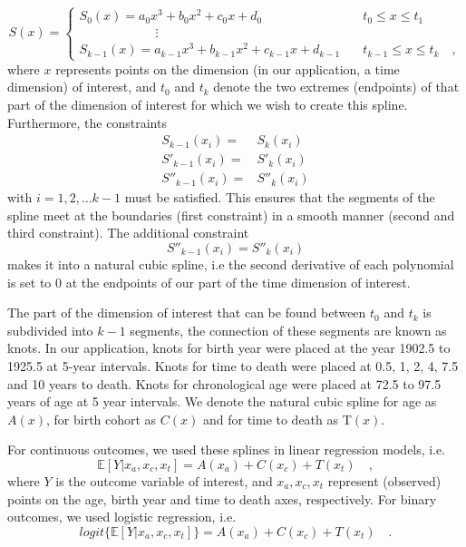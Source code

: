 \documentclass[12pt,oneside,letterpaper,doublespacing]{article}  %
\begin{document}
\begin{appendices}
\begin{equation}
S(x) = \begin{cases}
    S_0(x) = a_0x^3+b_0x^2+c_0x+d_0 &\quad t_0 \le x \le t_1 \\
    \quad\quad\quad\quad\quad\quad \vdots \\
    S_{k-1}(x) = a_{k-1}x^3 +b_{k-1}x^2+c_{k-1}x+d_{k-1} &\quad t_{k-1} \le x \le t_k        \quad ,   
\end{cases}
\end{equation}
where $x$ represents points on the dimension (in our application, a time dimension) of interest, and $t_0$ and $t_k$  denote the two extremes (endpoints) of that part of the dimension of interest for which we wish to create this spline. Furthermore, the constraints
\begin{align}
S_{k-1}(x_i) =& S_k(x_i)\\
S'_{k-1}(x_i) =& S'_k(x_i)\\
S''_{k-1}(x_i) =& S''_k(x_i)
\end{align}
with $i=1,2,\ldots k-1$ must be satisfied. This ensures that the segments of the spline meet at the boundaries (first constraint) in a smooth manner (second and third constraint). The additional constraint
\begin{equation}
S''_{k-1}(x_i) = S''_k(x_i)
\end{equation}
makes it into a natural cubic spline, i.e the second derivative of each polynomial is set to 0 at the endpoints of our part of the time dimension of interest.

The part of the dimension of interest that can be found between $t_0$ and $t_k$ is subdivided into $k-1$ segments, the connection of these segments are known as knots. In our application, knots for birth year were placed at the year 1902.5 to 1925.5 at 5-year intervals. Knots for time to death were placed at 0.5, 1, 2, 4, 7.5 and 10 years to death. Knots for chronological age were placed at 72.5 to 97.5 years of age at 5 year intervals. We denote the natural cubic spline for age as $A(x)$, for birth cohort as $C(x)$ and for time to death as T$(x)$.

For continuous outcomes, we used these splines in linear regression models, i.e.
\begin{equation}
\mathbb{E}[Y| x_a,x_c,x_t]=A(x_a)+C(x_c)+T(x_t) \quad,
\end{equation}
where $Y$ is the outcome variable of interest, and $x_a,x_c,x_t$ represent (observed) points on the age, birth year and time to death axes, respectively. For binary outcomes, we used logistic regression, i.e.
\begin{equation}
logit\{\mathbb{E}[Y| x_a,x_c,x_t]\}=A(x_a)+C(x_c)+T(x_t) \quad .
\end{equation}


\end{appendices}
\end{document}
